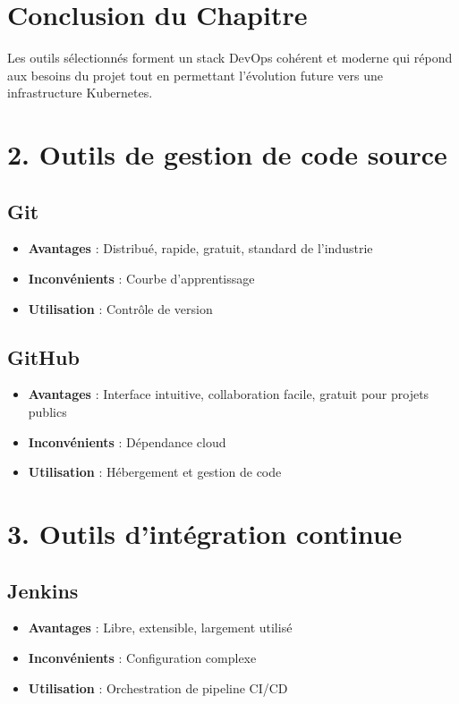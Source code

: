 \documentclass[12pt,a4paper]{report}
\begin{document}
\section{Conclusion du Chapitre}

Les outils sélectionnés forment un stack DevOps cohérent et moderne qui répond aux besoins du projet tout en permettant l'évolution future vers une infrastructure Kubernetes.

\section{2. Outils de gestion de code source}

\subsection{Git}

\begin{itemize}
    \item \textbf{Avantages} : Distribué, rapide, gratuit, standard de l'industrie
    \item \textbf{Inconvénients} : Courbe d'apprentissage
    \item \textbf{Utilisation} : Contrôle de version
\end{itemize}

\subsection{GitHub}

\begin{itemize}
    \item \textbf{Avantages} : Interface intuitive, collaboration facile, gratuit pour projets publics
    \item \textbf{Inconvénients} : Dépendance cloud
    \item \textbf{Utilisation} : Hébergement et gestion de code
\end{itemize}

\section{3. Outils d'intégration continue}

\subsection{Jenkins}

\begin{itemize}
    \item \textbf{Avantages} : Libre, extensible, largement utilisé
    \item \textbf{Inconvénients} : Configuration complexe
    \item \textbf{Utilisation} : Orchestration de pipeline CI/CD
\end{itemize}
\end{document}
